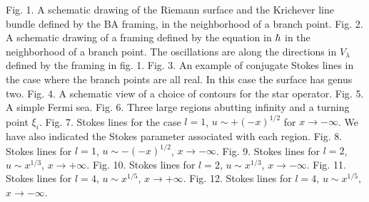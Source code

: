 \noindent
Fig. 1. A schematic drawing of the Riemann surface and the Krichever
line bundle defined by 
the BA framing, in the neighborhood of a branch point.
\bigskip
\noindent
Fig. 2. A schematic drawing of a framing defined by the equation in 
$\hbar$ in the neighborhood of a branch point. The oscillations are along 
the directions in $V_\lambda$ defined by the framing in fig. 1. 
\bigskip
\noindent
Fig. 3. An example of conjugate Stokes lines in the case where 
the branch points are all real. In this case the surface has genus
two. 
\bigskip
\noindent
Fig. 4. A schematic view of a choice of contours for the star operator.
\bigskip
\noindent
Fig. 5. A simple Fermi sea. 
\bigskip
\noindent
Fig. 6. Three large regions abutting infinity and a turning 
point $\xi_i$. 
\bigskip
\noindent
Fig. 7. Stokes lines for the case $l=1$, $u\sim +(-x)^{1/2}$
for $x\to-\infty$. We have also indicated the Stokes parameter 
associated with each region.
\bigskip
\noindent
Fig. 8. Stokes lines for $l=1$, $u\sim -(-x)^{1/2}$, $x\to-\infty$.
\bigskip
\noindent
Fig. 9. Stokes lines for $l=2$, $u\sim x^{1/3}$, $x\to+\infty$.
\bigskip
\noindent
Fig. 10. Stokes lines for $l=2$, $u\sim x^{1/3}$, $x\to-\infty$.
\bigskip
\noindent
Fig. 11. Stokes lines for $l=4$, $u\sim x^{1/5}$, $x\to+\infty$.
\bigskip
\noindent
Fig. 12. Stokes lines for $l=4$, $u\sim x^{1/5}$, $x\to-\infty$.



\listrefs
\bye




